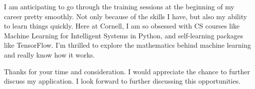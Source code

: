 \documentclass[letterpaper,10pt]{article}
\begin{document}
I am anticipating to go through the training sessions at the beginning of my career pretty smoothly. Not only because of the skills I have, but also my ability to learn things quickly. Here at Cornell, I am so obsessed with CS courses like Machine Learning for Intelligent Systems in Python, and self-learning packages like TensorFlow. I’m thrilled to explore the mathematics behind machine learning and really know how it works. 

Thanks for your time and consideration. I would appreciate the chance to further discuss my application. I look forward to further discussing this opportunities.
\end{document}
